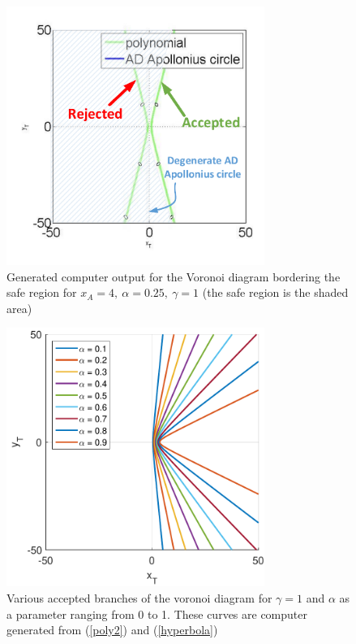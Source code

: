 \begin{figure}[htb]
\centering
\includegraphics[width=0.75\textwidth]{fig/g_1.pdf}
\caption{Generated computer output for the Voronoi diagram bordering the safe region for $x_A=4,\ \alpha=0.25,\ \gamma=1$ (the safe region is the shaded area)}
\label{gamma=1}
\end{figure}

\begin{figure}[htb]
\centering
\includegraphics[width=0.75\textwidth]{fig/VAR_alpha_g_1.pdf}
\caption{Various accepted branches of the voronoi diagram for $\gamma=1$ and $\alpha$ as a parameter ranging from 0 to 1. These curves are computer generated from (\ref{poly2}) and (\ref{hyperbola})}
\label{VAR_alpha_gamma=1}
\end{figure}


